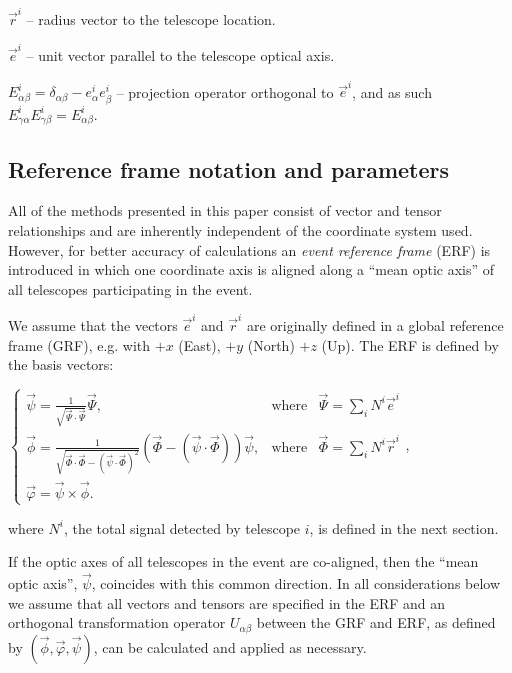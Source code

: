 \documentclass[letterpaper]{article}
\begin{document}
$\displaystyle \vec{r}^{i}$ -- radius vector to the telescope location.

$\displaystyle \vec{e}^{i}$ -- unit vector parallel to the telescope 
optical axis.

$\displaystyle E_{\alpha \beta }^{i}=
\delta_{\alpha \beta }-e_{\alpha }^{i}e_{\beta }^{i}$ -- 
projection operator orthogonal to $\vec{e}^{i}$, and as such
$\displaystyle E_{\gamma \alpha }^{i}E_{\gamma \beta
}^{i}=E_{\alpha \beta }^{i}$.

\subsection{Reference frame notation and parameters}

All of the methods presented in this paper consist of vector and
tensor relationships and are inherently independent of the coordinate
system used. However, for better accuracy of calculations an
\textit{event reference frame} (ERF) is introduced in which one
coordinate axis is aligned along a ``mean optic axis'' of all
telescopes participating in the event.

We assume that the vectors $\vec{e}^{i}$ and $\vec{r}^{i}$ are
originally defined in a global reference frame (GRF), e.g. with $+x$
(East), $+y$ (North) $+z$ (Up). The ERF is defined by the basis
vectors:

$\displaystyle \left\{\begin{array}{lll}
\vec{\psi}=\frac{1}{\sqrt{\vec{\Psi}\cdot\vec{\Psi}}}\vec{\Psi}, 
& \mathrm{where} & \vec{\Psi}=\sum\limits_{i}N^{i}\vec{e}^{i} \\ 
\vec{\phi}=\frac{1}{\sqrt{\vec{\Phi}\cdot\vec{\Phi}-
(\vec{\psi}\cdot\vec{\Phi})^2}}
\left(\vec{\Phi}-(\vec{\psi}\cdot\vec{\Phi})\right)\vec{\psi},
& \mathrm{where} & \vec{\Phi}=\sum\limits_{i}N^{i}\vec{r}^{i} \\
\vec{\varphi}=\vec{\psi}\times \vec{\phi}.
\end{array}
\right.$,

where $N^i$, the total signal detected by telescope $i$, is defined in
the next section.

If the optic axes of all telescopes in the event are co-aligned, then
the ``mean optic axis'', $\vec{\psi}$, coincides with this common
direction. In all considerations below we assume that all vectors and
tensors are specified in the ERF and an orthogonal transformation
operator $U_{\alpha\beta}$ between the GRF and ERF, as defined by
$(\vec{\phi}, \vec{\varphi}, \vec{\psi})$, can be calculated and
applied as necessary.
\end{document}
